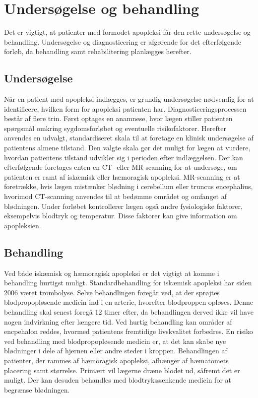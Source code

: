 \section{Undersøgelse og behandling}
Det er vigtigt, at patienter med formodet apopleksi får den rette undersøgelse og behandling. Undersøgelse og diagnosticering er afgørende for det efterfølgende forløb, da behandling samt rehabilitering planlægges herefter. \cite{Sundhedsstyrelsen2009}

\subsection{Undersøgelse}
Når en patient med apopleksi indlægges, er grundig undersøgelse nødvendig for at identificere, hvilken form for apopleksi patienten har. 
Diagnosticeringsprocessen består af flere trin. Først optages en anamnese, hvor lægen stiller patienten spørgsmål omkring sygdomsforløbet og eventuelle risikofaktorer. Herefter anvendes en udvalgt, standardiseret skala til at foretage en klinisk undersøgelse af patientens almene tilstand. Den valgte skala gør det muligt for lægen at vurdere, hvordan patientens tilstand udvikler sig i perioden efter indlæggelsen.
Der kan efterfølgende foretages enten en CT- eller MR-scanning for at undersøge, om patienten er ramt af iskæmisk eller hæmoragisk apopleksi. MR-scanning er at foretrække, hvis lægen mistænker blødning i cerebellum eller truncus encephalius, hvorimod CT-scanning anvendes til at bedømme området og omfanget af blødningen. Under forløbet kontrollerer lægen også andre fysiologiske faktorer, eksempelvis blodtryk og temperatur. Disse faktorer kan give information om apopleksien. \cite{Sundhedsstyrelsen2009,Schulze2011} 

\subsection{Behandling}
Ved både iskæmisk og hæmoragisk apopleksi er det vigtigt at komme i behandling hurtigst muligt. \cite{Soenderborg2013}  
Standardbehandling for iskæmisk apopleksi har siden 2006 været trombolyse. Selve behandlingen foregår ved, at der sprøjtes blodpropopløsende medicin ind i en arterie, hvorefter blodproppen opløses. Denne behandling skal senest foregå 12 timer efter, da behandlingen derved ikke vil have nogen indvirkning efter længere tid. Ved hurtig behandling kan områder af encpehalon reddes, hvormed patientens fremtidige livskvalitet forbedres. En risiko ved behandling med blodpropopløsende medicin er, at det kan skabe nye blødninger i dele af hjernen eller andre steder i kroppen. \cite{Hjernesagen2015b} Behandlingen af patienter, der rammes af hæmoragisk apopleksi, afhænger af hæmatomets placering samt størrelse. Primært vil lægerne dræne blodet ud, såfremt det er muligt. Der kan desuden behandles med blodtrykssænkende medicin for at begrænse blødningen. \cite{Caplan2006} 

